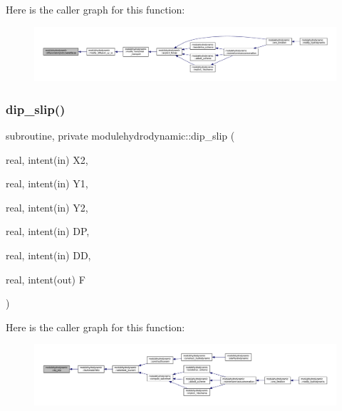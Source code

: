 Here is the caller graph for this function\+:\nopagebreak
\begin{figure}[H]
\begin{center}
\leavevmode
\includegraphics[width=350pt]{namespacemodulehydrodynamic_ab381daa0e16a21aa8f474a88fc7d11b7_icgraph}
\end{center}
\end{figure}
\mbox{\label{namespacemodulehydrodynamic_a95f2fab061ef070b4278d48f1e7028e2}} 
\subsubsection{\texorpdfstring{dip\+\_\+slip()}{dip\_slip()}}
{\footnotesize\ttfamily subroutine, private modulehydrodynamic\+::dip\+\_\+slip (\begin{DoxyParamCaption}\item[{real, intent(in)}]{X2,  }\item[{real, intent(in)}]{Y1,  }\item[{real, intent(in)}]{Y2,  }\item[{real, intent(in)}]{DP,  }\item[{real, intent(in)}]{DD,  }\item[{real, intent(out)}]{F }\end{DoxyParamCaption})\hspace{0.3cm}{\ttfamily [private]}}

Here is the caller graph for this function\+:\nopagebreak
\begin{figure}[H]
\begin{center}
\leavevmode
\includegraphics[width=350pt]{namespacemodulehydrodynamic_a95f2fab061ef070b4278d48f1e7028e2_icgraph}
\end{center}
\end{figure}
\mbox{\label{namespacemodulehydrodynamic_af887912ae7453edc3375d52c4f6cdfc3}} 
